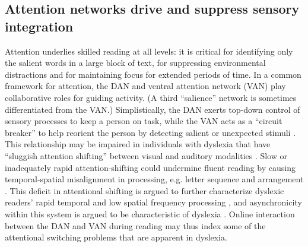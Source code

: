 \subsection{Attention networks drive and suppress sensory integration} 
Attention underlies skilled reading at all levels: it is critical for identifying only the salient words in a large block of text, for suppressing environmental distractions and for maintaining focus for extended periods of time. In a common framework for attention, the DAN and ventral attention network (VAN) play collaborative roles for guiding activity. (A third ``salience'' network is sometimes differentiated from the VAN.) Simplistically, the DAN exerts top-down control of sensory processes to keep a person on task, while the VAN acts as a ``circuit breaker'' to help reorient the person by detecting salient or unexpected stimuli \citep{Corbetta2002, Vossel2014}. This relationship may be impaired in individuals with dyslexia that have ``sluggish attention shifting'' between visual and auditory modalities \citep{Harrar2014}. Slow or inadequately rapid attention-shifting could undermine fluent reading by causing temporal-spatial misalignment in processing, e.g. letter sequence and arrangement \citep{Lallier2009}. This deficit in attentional shifting is argued to further characterize dyslexic readers' rapid temporal and low spatial frequency processing \citep{Witton1998}, and asynchronicity within this system is argued to be characteristic of dyslexia \citep{Lallier2009}. Online interaction between the DAN and VAN during reading may thus index some of the attentional switching problems that are apparent in dyslexia. 

